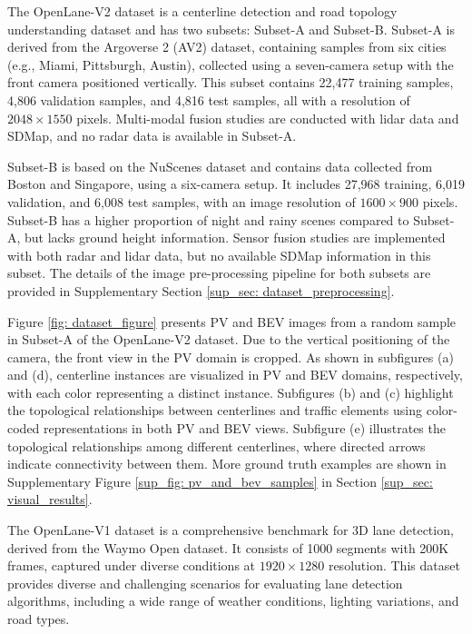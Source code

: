 The OpenLane-V2 dataset \cite{wang2024openlane} is a centerline detection and road topology understanding dataset and has two subsets: Subset-A and Subset-B. Subset-A is derived from the Argoverse 2 (AV2) \cite{wilson2023argoverse} dataset, containing samples from six cities (e.g., Miami, Pittsburgh, Austin), collected using a seven-camera setup with the front camera positioned vertically. This subset contains 22,477 training samples, 4,806 validation samples, and 4,816 test samples, all with a resolution of $2048\times1550$ pixels. Multi-modal fusion studies are conducted with lidar data and SDMap, and no radar data is available in Subset-A.

Subset-B is based on the NuScenes \cite{caesar2020nuscenes} dataset and contains data collected from Boston and Singapore, using a six-camera setup. It includes 27,968 training, 6,019 validation, and 6,008 test samples, with an image resolution of $1600\times900$ pixels. Subset-B has a higher proportion of night and rainy scenes compared to Subset-A, but lacks ground height information. Sensor fusion studies are implemented with both radar and lidar data, but no available SDMap information in this subset. The details of the image pre-processing pipeline for both subsets are provided in Supplementary Section \ref{sup_sec: dataset_preprocessing}.

Figure \ref{fig: dataset_figure} presents PV and BEV images from a random sample in Subset-A of the OpenLane-V2 dataset. Due to the vertical positioning of the camera, the front view in the PV domain is cropped. As shown in subfigures (a) and (d), centerline instances are visualized in PV and BEV domains, respectively, with each color representing a distinct instance. Subfigures (b) and (c) highlight the topological relationships between centerlines and traffic elements using color-coded representations in both PV and BEV views. Subfigure (e) illustrates the topological relationships among different centerlines, where directed arrows indicate connectivity between them. More ground truth examples are shown in Supplementary Figure \ref{sup_fig: pv_and_bev_samples} in Section \ref{sup_sec: visual_results}. 

The OpenLane-V1 dataset  \cite{chen2022persformer} is a comprehensive benchmark for 3D lane detection, derived from the Waymo Open dataset. It consists of 1000 segments with 200K frames, captured under diverse conditions at $1920\times1280$ resolution. This dataset provides diverse and challenging scenarios for evaluating lane detection algorithms, including a wide range of weather conditions, lighting variations, and road types. 


